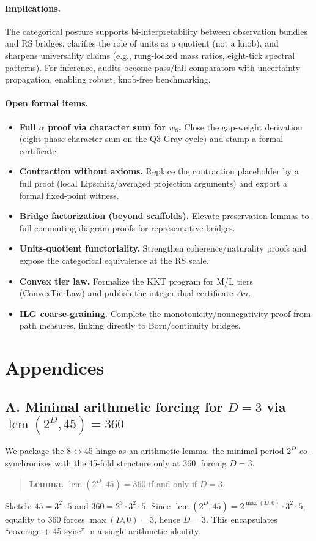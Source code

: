 \documentclass[11pt]{article}
\begin{document}
\paragraph{Implications.} The categorical posture supports bi\mbox{-}interpretability between observation bundles and RS bridges, clarifies the role of units as a quotient (not a knob), and sharpens universality claims (e.g., rung\mbox{-}locked mass ratios, eight\mbox{-}tick spectral patterns). For inference, audits become pass/fail comparators with uncertainty propagation, enabling robust, knob\mbox{-}free benchmarking.

\paragraph{Open formal items.}
\begin{itemize}
  \item \textbf{Full \(\alpha\) proof via character sum for \(w_8\).} Close the gap\mbox{-}weight derivation (eight\mbox{-}phase character sum on the Q3 Gray cycle) and stamp a formal certificate.
  \item \textbf{Contraction without axioms.} Replace the contraction placeholder by a full proof (local Lipschitz/averaged projection arguments) and export a formal fixed\mbox{-}point witness.
  \item \textbf{Bridge factorization (beyond scaffolds).} Elevate preservation lemmas to full commuting diagram proofs for representative bridges.
  \item \textbf{Units\mbox{-}quotient functoriality.} Strengthen coherence/naturality proofs and expose the categorical equivalence at the RS scale.
  \item \textbf{Convex tier law.} Formalize the KKT program for M/L tiers (ConvexTierLaw) and publish the integer dual certificate \(\Delta n\).
  \item \textbf{ILG coarse\mbox{-}graining.} Complete the monotonicity/nonnegativity proof from path measures, linking directly to Born/continuity bridges.
\end{itemize}

\appendix

\section*{Appendices}

\subsection*{A. Minimal arithmetic forcing for \(D=3\) via \(\operatorname{lcm}(2^D,45)=360\)}
We package the 8\(\leftrightarrow\)45 hinge as an arithmetic lemma: the minimal period \(2^D\) co\mbox{-}synchronizes with the 45\mbox{-}fold structure only at 360, forcing \(D=3\).
\begin{quote}
\textbf{Lemma.} \(\operatorname{lcm}(2^D,45)=360\) if and only if \(D=3\).
\end{quote}
Sketch: \(45=3^2\cdot 5\) and \(360=2^3\cdot 3^2\cdot 5\). Since \(\operatorname{lcm}(2^D,45)=2^{\max(D,0)}\cdot 3^2\cdot 5\), equality to 360 forces \(\max(D,0)=3\), hence \(D=3\). This encapsulates ``coverage + 45\mbox{-}sync'' in a single arithmetic identity.
\end{document}
